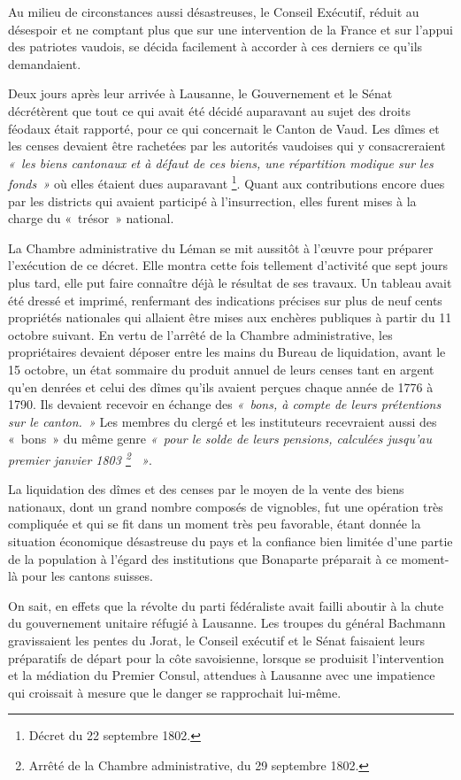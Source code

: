 \documentclass[french,twoside]{book} %
\begin{document}
Au milieu de circonstances aussi désastreuses, le Conseil Exécutif, réduit au désespoir et ne comptant plus que sur une intervention de la France et sur l’appui des patriotes vaudois, se décida facilement à accorder à ces derniers ce qu’ils demandaient.\par
Deux jours après leur arrivée à Lausanne, le Gouvernement et le Sénat décrétèrent que tout ce qui avait été décidé auparavant au sujet des droits féodaux était rapporté, pour ce qui concernait le Canton de Vaud. Les dîmes et les censes devaient être rachetées par les autorités vaudoises qui y consacreraient \emph{« les biens cantonaux et à défaut de ces biens, une répartition modique sur les fonds »} où elles étaient dues auparavant \footnote{Décret du 22 septembre 1802.}. Quant aux contributions encore dues par les districts qui avaient participé à l’insurrection, elles furent mises à la charge du « trésor » national.\par
La Chambre administrative du Léman se mit aussitôt à l’œuvre pour préparer l’exécution de ce décret. Elle montra cette fois tellement d’activité que sept jours plus tard, elle put faire connaître déjà le résultat de ses travaux. Un tableau avait été dressé et imprimé, renfermant des indications précises sur plus de neuf cents propriétés nationales qui allaient être mises aux enchères publiques à partir du 11 octobre suivant. En vertu de l’arrêté de la Chambre administrative, les propriétaires devaient déposer entre les mains du Bureau de liquidation, avant le 15 octobre, un état sommaire du produit annuel de leurs censes tant en argent qu’en denrées et celui des dîmes qu’ils avaient perçues chaque année de 1776 à 1790. Ils devaient recevoir en échange des \emph{« bons, à compte de leurs prétentions sur le canton. »} Les membres du clergé et les instituteurs recevraient aussi des « bons » du même genre \emph{« pour le solde de leurs pensions, calculées jusqu’au premier janvier 1803 \footnote{Arrêté de la Chambre administrative, du 29 septembre 1802.}  »}.\par
La liquidation des dîmes et des censes par le moyen de la vente des biens nationaux, dont un grand nombre composés de vignobles, fut une opération très compliquée et qui se fit dans un moment très peu favorable, étant donnée la situation économique désastreuse du pays et la confiance bien limitée d’une partie de la population à l’égard des institutions que Bonaparte préparait à ce moment-là pour les cantons suisses.\par
On sait, en effets que la révolte du parti fédéraliste avait failli aboutir à la chute du gouvernement unitaire réfugié à Lausanne. Les troupes du général Bachmann gravissaient les pentes du Jorat, le Conseil exécutif et le Sénat faisaient leurs préparatifs de départ pour la côte savoisienne, lorsque se produisit l’intervention et la médiation du Premier Consul, attendues à Lausanne avec une impatience qui croissait à mesure que le danger se rapprochait lui-même.\par
\end{document}
